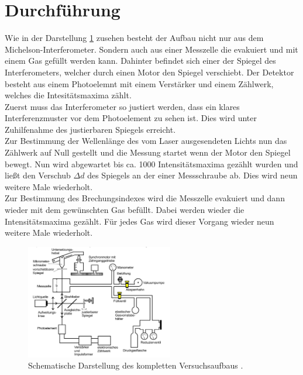 \section{Durchführung}
Wie in der Darstellung \ref{fig:KA} zusehen besteht der Aufbau nicht nur aus
dem Michelson-Interferometer. Sondern auch aus einer Messzelle die evakuiert und
mit einem Gas gefüllt werden kann. Dahinter befindet sich einer der Spiegel des
Interferometers, welcher durch einen Motor den Spiegel verschiebt. Der Detektor
besteht aus einem Photoelemnt mit einem Verstärker und einem Zählwerk, welches
die Intesitätsmaxima zählt. \\
Zuerst muss das Interferometer so justiert werden, dass ein klares Interferenzmuster
vor dem Photoelement zu sehen ist. Dies wird unter Zuhilfenahme des justierbaren
Spiegels erreicht.\\
Zur Bestimmung der Wellenlänge des vom Laser ausgesendeten Lichts nun das Zählwerk
auf Null gestellt und die Messung startet wenn der Motor den Spiegel bewegt.
Nun wird abgewartet bis ca. 1000 Intensitätsmaxima gezählt wurden und
ließt den Verschub $\Delta d$ des Spiegels an der einer Messschraube ab.
Dies wird neun weitere Male wiederholt.\\
Zur Bestimmung des Brechungsindexes wird die Messzelle evakuiert und dann wieder
mit dem gewünschten Gas befüllt. Dabei werden wieder die Intensitätsmaxima
gezählt. Für jedes Gas wird dieser Vorgang wieder neun weitere Male wiederholt.

\label{sec:Durchführung}
\begin{figure}
  \centering
  \includegraphics[height=5cm]{logos/Aufbau.png}
  \caption{Schematische Darstellung des kompletten Versuchsaufbaus \cite{Anleitung}. }
  \label{fig:KA}
\end{figure}
